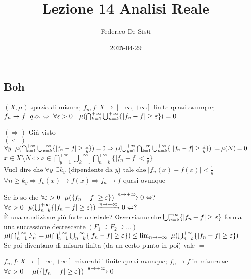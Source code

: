 \documentclass[12px]{article}
\title{Lezione 14 Analisi Reale}
\date{2025-04-29}
\author{Federico De Sisti}
\begin{document}
	\maketitle
	\newpage
	\subsection{Boh}
	\begin{prop}
		$(X,\mu)$ spazio di misura; $f_n, f: X \rightarrow[-\infty,+\infty]$ finite quasi ovunque; $f_n \rightarrow f \ \ q.o. \Leftrightarrow \ \forall \e>0\ \ \ \mu( \bigcap_{k=1}^{+\infty} \bigcup^{+\infty}_{n=k}\{|f_n-f|\geq \e\})=0$
	\end{prop}
	\begin{dimo}
		$ ( \Rightarrow )$ Già visto \\
		$( \Leftarrow)$  $\forall y \ \ \mu( \bigcap^{+\infty}_{n = 1} \bigcup^{+\infty}_{n=k}\{|f_n-f|\geq \frac 1y\}) = 0 \\\Rightarrow  \mu( \bigcup^{+\infty}_{y = 1} \bigcap^{+\infty}_{k =1} \bigcup^{+\infty}_{n = k}\{\ |f_n-f|\geq \frac 1y\}) := \mu(N) = 0$\\
		$x\in X\setminus N \Leftrightarrow x\in \bigcap^{+\infty}_{y = 1} \bigcup^{+\infty}_{k = 1} \bigcap^{+\infty}_{n=k}\{|f_n-f| <\frac 1y\}$\\
		Vuol dire che $\forall y \ \ \exists k_y$ (dipendente da  $y$) tale che $|f_n(x) -f(x)| < \frac 1y$\\
		 $\forall n\geq k_y \Rightarrow  f_n(x) \rightarrow f(x) \Rightarrow  f_n \rightarrow f$ quasi ovunque
	\end{dimo}
	Se io so che $\forall \e > 0 \ \ \mu(\{f_n-f|\geq\e\}) \xrightarrow{ n \rightarrow + \infty} 0 \Leftrightarrow ?$\\
	$\forall \varepsilon > 0 \ \ \mu( \bigcup^{+\infty}_{n=k}\{|f_n-f|\geq \varepsilon\}) \xrightarrow{n \rightarrow +\infty} 0 \Leftrightarrow ?$\\
	È una condizione più forte o debole?
	Osserviamo che $ \bigcup^{+\infty}_{n = k}\{|f_n-f|\geq \varepsilon\}$ forma una successione decrescente $( F_1\supseteq F_2\supseteq\ldots)$\\
	$\mu( \bigcap^{+\infty}_{n=1}F_n^\varepsilon = \mu ( \bigcap^{+\infty}_{n=1} \bigcup^{+\infty}_{n=k}\{|f_n-f|\geq \varepsilon\})\leq \lim_{ n \rightarrow +\infty}\ \mu( \bigcup^{+\infty}_{n = k}\{|f_n-f|\geq \varepsilon\})$\\
		Se poi diventano di misura finita (da un certo punto in poi) vale $=$\\
		 \begin{defi}
			 $f_n, f : X \rightarrow[-\infty,+\infty]$ misurabili finite quasi ovunque; $f_n \rightarrow f$ in misura se $\forall \e>0 \ \ \ \ \mu(\{|f_n-f|\geq\e\}) \xrightarrow{n \rightarrow +\infty} 0$
		\end{defi}
\end{document}
